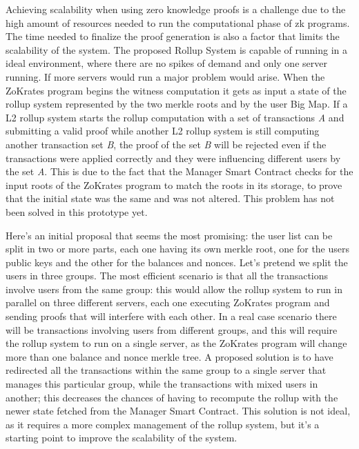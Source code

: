 Achieving scalability when using zero knowledge proofs is a challenge due to the high amount of resources needed to run the computational phase of zk programs. The time needed to finalize the proof generation is also a factor that limits the scalability of the system. The proposed Rollup System is capable of running in a ideal environment, where there are no spikes of demand and only one server running. If more servers would run a major problem would arise. When the ZoKrates program begins the witness computation it gets as input a state of the rollup system represented by the two merkle roots and by the user Big Map. If a L2 rollup system starts the rollup computation with a set of transactions \textit{A} and submitting a valid proof while another L2 rollup system is still computing another transaction set \textit{B}, the proof of the set \textit{B} will be rejected even if the transactions were applied correctly and they were influencing different users by the set \textit{A}. This is due to the fact that the Manager Smart Contract checks for the input roots of the ZoKrates program to match the roots in its storage, to prove that the initial state was the same and was not altered. This problem has not been solved in this prototype yet.

Here's an initial proposal that seems the most promising: the user list can be split in two or more parts, each one having its own merkle root, one for the users public keys and the other for the balances and nonces. Let's pretend we split the users in three groups. The most efficient scenario is that all the transactions involve users from the same group: this would allow the rollup system to run in parallel on three different servers, each one executing ZoKrates program and sending proofs that will interfere with each other. In a real case scenario there will be transactions involving users from different groups, and this will require the rollup system to run on a single server, as the ZoKrates program will change more than one balance and nonce merkle tree. A proposed solution is to have redirected all the transactions within the same group to a single server that manages this particular group, while the transactions with mixed users in another; this decreases the chances of having to recompute the rollup with the newer state fetched from the Manager Smart Contract. This solution is not ideal, as it requires a more complex management of the rollup system, but it's a starting point to improve the scalability of the system.